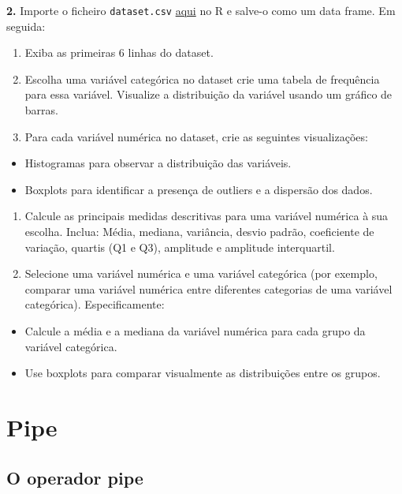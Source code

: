 \documentclass[
]{book}
\providecommand{\tightlist}{%
  \setlength{\itemsep}{0pt}\setlength{\parskip}{0pt}}
\begin{document}
\textbf{2.} Importe o ficheiro \texttt{dataset.csv} \href{https://renatorpaula.wixsite.com/renato/laboratorio-estatistica}{aqui} no R e salve-o como um data frame. Em seguida:

\begin{enumerate}
\def\labelenumi{(\alph{enumi})}
\item
  Exiba as primeiras 6 linhas do dataset.
\item
  Escolha uma variável categórica no dataset crie uma tabela de frequência para essa variável. Visualize a distribuição da variável usando um gráfico de barras.
\item
  Para cada variável numérica no dataset, crie as seguintes visualizações:
\end{enumerate}

\begin{itemize}
\tightlist
\item
  Histogramas para observar a distribuição das variáveis.
\item
  Boxplots para identificar a presença de outliers e a dispersão dos dados.
\end{itemize}

\begin{enumerate}
\def\labelenumi{(\alph{enumi})}
\setcounter{enumi}{3}
\item
  Calcule as principais medidas descritivas para uma variável numérica à sua escolha. Inclua: Média, mediana, variância, desvio padrão, coeficiente de variação, quartis (Q1 e Q3), amplitude e amplitude interquartil.
\item
  Selecione uma variável numérica e uma variável categórica (por exemplo, comparar uma variável numérica entre diferentes categorias de uma variável categórica). Especificamente:
\end{enumerate}

\begin{itemize}
\tightlist
\item
  Calcule a média e a mediana da variável numérica para cada grupo da variável categórica.
\item
  Use boxplots para comparar visualmente as distribuições entre os grupos.
\end{itemize}

\chapter{Pipe}\label{pipe}

\section{O operador pipe}\label{o-operador-pipe}
\end{document}
